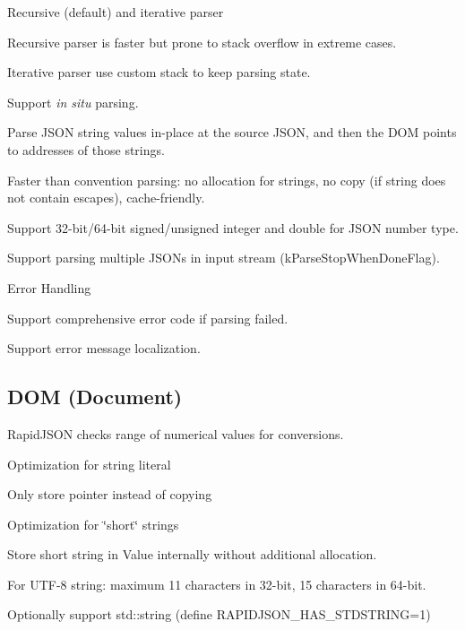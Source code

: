\begin{DoxyItemize}
\item Recursive (default) and iterative parser
\begin{DoxyItemize}
\item Recursive parser is faster but prone to stack overflow in extreme cases.
\item Iterative parser use custom stack to keep parsing state.
\end{DoxyItemize}
\item Support {\itshape in situ} parsing.
\begin{DoxyItemize}
\item Parse J\+S\+ON string values in-\/place at the source J\+S\+ON, and then the D\+OM points to addresses of those strings.
\item Faster than convention parsing\+: no allocation for strings, no copy (if string does not contain escapes), cache-\/friendly.
\end{DoxyItemize}
\item Support 32-\/bit/64-\/bit signed/unsigned integer and {\ttfamily double} for J\+S\+ON number type.
\item Support parsing multiple J\+S\+O\+Ns in input stream ({\ttfamily k\+Parse\+Stop\+When\+Done\+Flag}).
\item Error Handling
\begin{DoxyItemize}
\item Support comprehensive error code if parsing failed.
\item Support error message localization.
\end{DoxyItemize}
\end{DoxyItemize}

\subsection*{D\+OM (Document)}


\begin{DoxyItemize}
\item Rapid\+J\+S\+ON checks range of numerical values for conversions.
\item Optimization for string literal
\begin{DoxyItemize}
\item Only store pointer instead of copying
\end{DoxyItemize}
\item Optimization for \char`\"{}short\char`\"{} strings
\begin{DoxyItemize}
\item Store short string in {\ttfamily Value} internally without additional allocation.
\item For U\+T\+F-\/8 string\+: maximum 11 characters in 32-\/bit, 15 characters in 64-\/bit.
\end{DoxyItemize}
\item Optionally support {\ttfamily std\+::string} (define {\ttfamily R\+A\+P\+I\+D\+J\+S\+O\+N\+\_\+\+H\+A\+S\+\_\+\+S\+T\+D\+S\+T\+R\+I\+NG=1})
\end{DoxyItemize}

